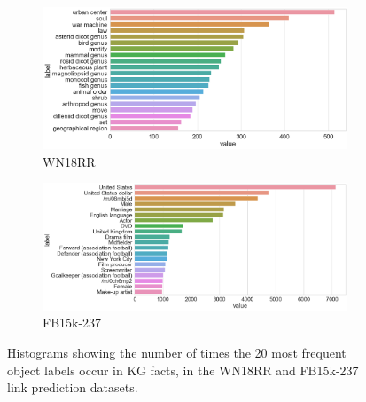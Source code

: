 \begin{figure}[H]
	\begin{subfigure}[b]{.5\linewidth}
   		\centering
    		\includegraphics[width=1.0\linewidth, height=0.7\linewidth]{WN18RR_Object_Counts}
		\captionsetup{justification=centering}
		\caption{WN18RR}
	\end{subfigure}
	\begin{subfigure}[b]{.5\linewidth}
   		\centering
		\includegraphics[width=1.0\linewidth, height=0.7\linewidth]{FB15k-237_Object_Counts}
		\captionsetup{justification=centering}
		\caption{FB15k-237}
	\end{subfigure}
	\caption{Histograms showing the number of times the 20 most frequent object labels occur in KG facts, in the WN18RR and FB15k-237 link prediction datasets.}
\end{figure}


